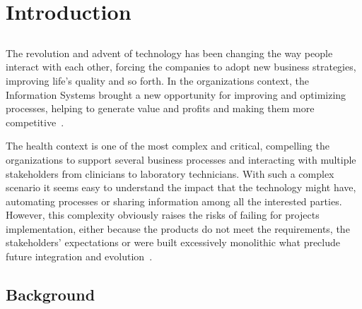 \chapter{Introduction} \label{chap:intro}

\section*{}




The revolution and advent of technology has been changing the way people interact with each other, forcing the companies to adopt new business strategies, improving life's quality and so forth. In the organizations context, the Information Systems brought a new opportunity for improving and optimizing processes, helping to generate value and profits and making them more competitive~\citep{Gurbaxani1991}.

The health context is one of the most complex and critical, compelling the organizations to support several business processes and interacting with multiple stakeholders from clinicians to laboratory technicians. With such a complex scenario it seems easy to understand the impact that the technology might have, automating processes or sharing information among all the interested parties. However, this complexity obviously raises the risks of failing for projects implementation, either because the products do not meet the requirements, the stakeholders' expectations or were built excessively monolithic what preclude future integration and evolution~\citep{Chu2006}.

\section{Background} \label{sec:background}

